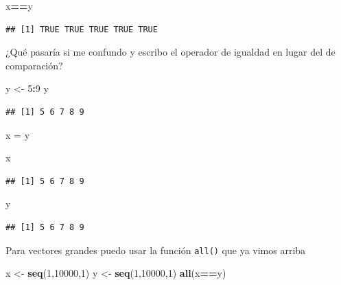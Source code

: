 \documentclass[
]{book}
\newenvironment{Shaded}{\begin{snugshade}}{\end{snugshade}}
\newcommand{\DecValTok}[1]{\textcolor[rgb]{0.00,0.00,0.81}{#1}}
\newcommand{\FunctionTok}[1]{\textcolor[rgb]{0.13,0.29,0.53}{\textbf{#1}}}
\newcommand{\NormalTok}[1]{#1}
\newcommand{\OtherTok}[1]{\textcolor[rgb]{0.56,0.35,0.01}{#1}}
\newcommand{\SpecialCharTok}[1]{\textcolor[rgb]{0.81,0.36,0.00}{\textbf{#1}}}
\begin{document}
\begin{Shaded}
\begin{Highlighting}[]
\NormalTok{x}\SpecialCharTok{==}\NormalTok{y}
\end{Highlighting}
\end{Shaded}

\begin{verbatim}
## [1] TRUE TRUE TRUE TRUE TRUE
\end{verbatim}

¿Qué pasaría si me confundo y escribo el operador de igualdad en lugar del de comparación?

\begin{Shaded}
\begin{Highlighting}[]
\NormalTok{y }\OtherTok{\textless{}{-}} \DecValTok{5}\SpecialCharTok{:}\DecValTok{9}
\NormalTok{y}
\end{Highlighting}
\end{Shaded}

\begin{verbatim}
## [1] 5 6 7 8 9
\end{verbatim}

\begin{Shaded}
\begin{Highlighting}[]
\NormalTok{x }\OtherTok{=}\NormalTok{ y}
\end{Highlighting}
\end{Shaded}

\begin{Shaded}
\begin{Highlighting}[]
\NormalTok{x}
\end{Highlighting}
\end{Shaded}

\begin{verbatim}
## [1] 5 6 7 8 9
\end{verbatim}

\begin{Shaded}
\begin{Highlighting}[]
\NormalTok{y}
\end{Highlighting}
\end{Shaded}

\begin{verbatim}
## [1] 5 6 7 8 9
\end{verbatim}

Para vectores grandes puedo usar la función \texttt{all()} que ya vimos arriba

\begin{Shaded}
\begin{Highlighting}[]
\NormalTok{x }\OtherTok{\textless{}{-}} \FunctionTok{seq}\NormalTok{(}\DecValTok{1}\NormalTok{,}\DecValTok{10000}\NormalTok{,}\DecValTok{1}\NormalTok{)}
\NormalTok{y }\OtherTok{\textless{}{-}} \FunctionTok{seq}\NormalTok{(}\DecValTok{1}\NormalTok{,}\DecValTok{10000}\NormalTok{,}\DecValTok{1}\NormalTok{)}
\FunctionTok{all}\NormalTok{(x}\SpecialCharTok{==}\NormalTok{y)}
\end{Highlighting}
\end{Shaded}
\end{document}
